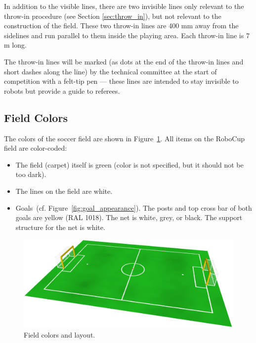 \documentclass[12pt]{article}
\newcommand{\cf}{\mbox{cf.}\xspace}
\begin{document}
In addition to the visible lines, there are two invisible lines only relevant to the throw-in procedure (see Section \ref{sec:throw_in}), but not relevant to the construction of the field. These two throw-in lines are 400 mm away from the sidelines and run parallel to them inside the playing area.  Each throw-in line is 7 m long.

The throw-in lines will be marked (as dots at the end of the throw-in lines and short dashes along the line) by the technical committee at the start of competition with a felt-tip pen --- these lines are intended to stay invisible to robots but provide a guide to referees.

\subsection{Field Colors}

The colors of the soccer field are shown in Figure~\ref{fig:field_color}. All items on the RoboCup field are color-coded:

\begin{itemize}

\item The field (carpet) itself is green (color is not specified, but it should not be too dark).

\item The lines on the field are white.

\item Goals~(\cf Figure~\ref{fig:goal_appearance}). The posts and top cross bar of both goals are yellow (RAL 1018). The net is white, grey, or black.  The support structure for the net is white.

\end{itemize}

\begin{figure}[t]
\centerline{\includegraphics[width=\columnwidth]{figs/emptyfield_2014.png}}
\caption{Field colors and layout.}
\label{fig:field_color}
\end{figure}
\end{document}
